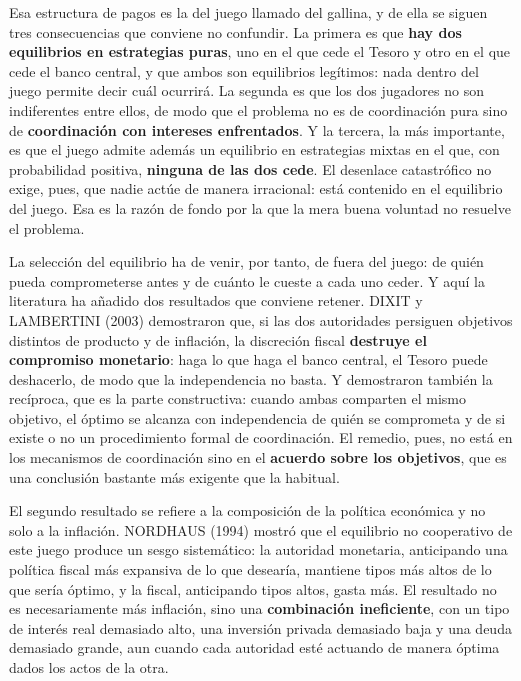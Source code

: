 \documentclass[10pt,a4paper]{article}
\begin{document}
Esa estructura de pagos es la del juego llamado del gallina, y de ella se siguen tres consecuencias que conviene no confundir. La primera es que \textbf{hay dos equilibrios en estrategias puras}, uno en el que cede el Tesoro y otro en el que cede el banco central, y que ambos son equilibrios legítimos: nada dentro del juego permite decir cuál ocurrirá. La segunda es que los dos jugadores no son indiferentes entre ellos, de modo que el problema no es de coordinación pura sino de \textbf{coordinación con intereses enfrentados}. Y la tercera, la más importante, es que el juego admite además un equilibrio en estrategias mixtas en el que, con probabilidad positiva, \textbf{ninguna de las dos cede}. El desenlace catastrófico no exige, pues, que nadie actúe de manera irracional: está contenido en el equilibrio del juego. Esa es la razón de fondo por la que la mera buena voluntad no resuelve el problema.

La selección del equilibrio ha de venir, por tanto, de fuera del juego: de quién pueda comprometerse antes y de cuánto le cueste a cada uno ceder. Y aquí la literatura ha añadido dos resultados que conviene retener. DIXIT y LAMBERTINI (2003) demostraron que, si las dos autoridades persiguen objetivos distintos de producto y de inflación, la discreción fiscal \textbf{destruye el compromiso monetario}: haga lo que haga el banco central, el Tesoro puede deshacerlo, de modo que la independencia no basta. Y demostraron también la recíproca, que es la parte constructiva: cuando ambas comparten el mismo objetivo, el óptimo se alcanza con independencia de quién se comprometa y de si existe o no un procedimiento formal de coordinación. El remedio, pues, no está en los mecanismos de coordinación sino en el \textbf{acuerdo sobre los objetivos}, que es una conclusión bastante más exigente que la habitual.

El segundo resultado se refiere a la composición de la política económica y no solo a la inflación. NORDHAUS (1994) mostró que el equilibrio no cooperativo de este juego produce un sesgo sistemático: la autoridad monetaria, anticipando una política fiscal más expansiva de lo que desearía, mantiene tipos más altos de lo que sería óptimo, y la fiscal, anticipando tipos altos, gasta más. El resultado no es necesariamente más inflación, sino una \textbf{combinación ineficiente}, con un tipo de interés real demasiado alto, una inversión privada demasiado baja y una deuda demasiado grande, aun cuando cada autoridad esté actuando de manera óptima dados los actos de la otra.
\end{document}
